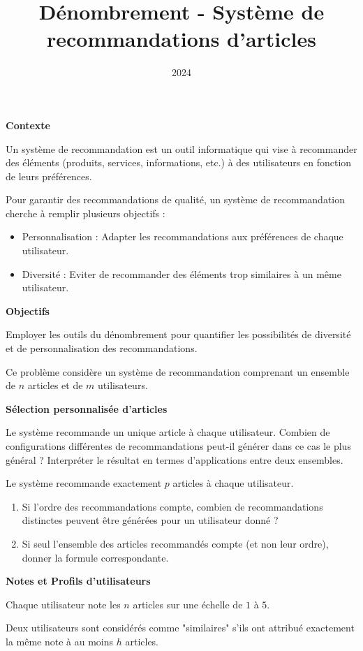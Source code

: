 \documentclass[10pt,a4paper]{article}
\title{Dénombrement - Système de recommandations d'articles}
\author{}
\date{2024}
\begin{document}
\textbf{Contexte}

Un système de recommandation est un outil informatique qui vise à recommander des éléments
(produits, services, informations, etc.) à des utilisateurs en fonction de leurs préférences.

Pour garantir des recommandations de qualité, un système de recommandation cherche à remplir
plusieurs objectifs :
\begin{itemize}
    \item Personnalisation : Adapter les recommandations aux préférences de chaque utilisateur.
    \item Diversité : Eviter de recommander des éléments trop similaires à un même utilisateur.
\end{itemize}
\bigskip

\textbf{Objectifs}

Employer les outils du dénombrement pour quantifier les possibilités de diversité et de
personnalisation des recommandations.

\bigskip
Ce problème considère un système de recommandation comprenant un ensemble de \( n \) articles et de
\( m \) utilisateurs.


\q \textbf{Sélection personnalisée d'articles}

    Le système recommande un unique article à chaque utilisateur. Combien de configurations
    différentes de recommandations peut-il générer dans ce cas le plus général ? Interpréter le
    résultat en termes d'applications entre deux ensembles.

    Le système recommande exactement \( p \) articles à chaque utilisateur.

   \begin{enumerate}
      \item Si l'ordre des recommandations compte, combien de recommandations distinctes peuvent
      être générées pour un utilisateur donné ?
      \item Si seul l'ensemble des articles recommandés compte (et non leur ordre), donner la formule
      correspondante.
    \end{enumerate}


\q \textbf{Notes et Profils d'utilisateurs}

   Chaque utilisateur note les \( n \) articles sur une échelle de \( 1 \) à \( 5 \).

   Deux utilisateurs sont considérés comme "similaires" s'ils ont attribué exactement la même note à
   au moins \( h \) articles.
\end{document}
